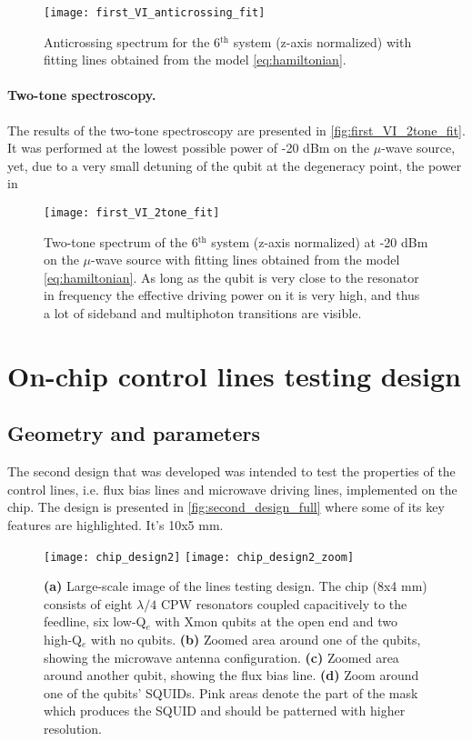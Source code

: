 \begin{figure}
\centering
\texttt{[image: first\_VI\_anticrossing\_fit]}
\caption{Anticrossing spectrum for the 6$^\text{th}$ system (z-axis normalized) with fitting lines obtained from the model \eqref{eq:hamiltonian}. }
\label{fig:first_VI_anticrossing_fit}
\end{figure}

\paragraph{Two-tone spectroscopy.} The results of the two-tone spectroscopy are presented in \autoref{fig:first_VI_2tone_fit}. It was performed at the lowest possible power of -20 dBm on the $\mu$-wave source, yet, due to a very small detuning of the qubit at the degeneracy point, the power in

\begin{figure}
\centering
\texttt{[image: first\_VI\_2tone\_fit]}
\caption{Two-tone spectrum of the 6$^\text{th}$ system (z-axis normalized) at -20 dBm on the $\mu$-wave source with fitting lines obtained from the model \eqref{eq:hamiltonian}. As long as the qubit is very close to the resonator in frequency the effective driving power on it is very high, and thus a lot of sideband and multiphoton transitions are visible.}
\label{fig:first_VI_2tone_fit}
\end{figure}

\newpage

\section{On-chip control lines testing design}

\subsection{Geometry and parameters}

The second design that was developed was intended to test the properties of the control lines, i.e. flux bias lines and microwave driving lines, implemented on the chip. The design is presented in \autoref{fig:second_design_full} where some of its key features are highlighted. It's 10x5 mm.

\begin{figure}[h!]
\centering
\texttt{[image: chip\_design2]}
\texttt{[image: chip\_design2\_zoom]}
\caption{\textbf{(a)} Large-scale image of the lines testing design. The chip (8x4 mm) consists of eight $\lambda/4$ CPW resonators coupled capacitively to the feedline, six low-Q$_e$ with Xmon qubits at the open end and two high-Q$_e$ with no qubits. \textbf{(b)} Zoomed area around one of the qubits, showing the microwave antenna configuration. \textbf{(c)} Zoomed area around another qubit, showing the flux bias line. \textbf{(d)} Zoom around one of the qubits' SQUIDs. Pink areas denote the part of the mask which produces the SQUID and should be patterned with higher resolution.}
\label{fig:second_design_full}
\end{figure}

